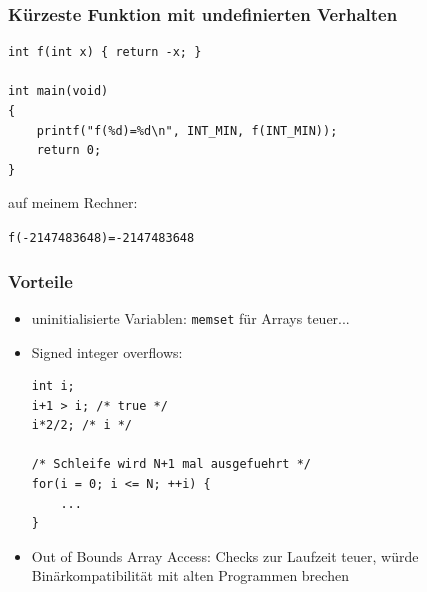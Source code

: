 \documentclass[12pt,compress]{beamer}
\begin{document}

\begin{frame}[fragile]
\frametitle{Kürzeste Funktion mit undefinierten Verhalten}

\begin{lstlisting}
int f(int x) { return -x; }

int main(void)
{
    printf("f(%d)=%d\n", INT_MIN, f(INT_MIN));
    return 0;
}
\end{lstlisting}

\vfill

auf meinem Rechner:

\texttt{f(-2147483648)=-2147483648}
\end{frame}


\begin{frame}[fragile]
\frametitle{Vorteile}

\begin{itemize}
\item uninitialisierte Variablen: \texttt{memset} für Arrays teuer...
\item Signed integer overflows:
\begin{lstlisting}
int i;
i+1 > i; /* true */ 
i*2/2; /* i */

/* Schleife wird N+1 mal ausgefuehrt */
for(i = 0; i <= N; ++i) {
	...
}
\end{lstlisting}
\item Out of Bounds Array Access: Checks zur Laufzeit teuer, würde Binärkompatibilität mit alten Programmen brechen
\end{itemize}
\end{frame}
\end{document}
